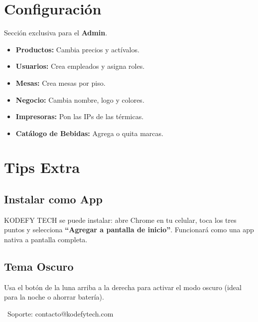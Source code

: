\documentclass[10pt,a4paper,twoside]{article}
\begin{document}
\section{Configuración}

Sección exclusiva para el \textbf{Admin}.

\begin{itemize}[itemsep=1pt, leftmargin=15pt]
    \item \textbf{Productos:} Cambia precios y actívalos.
    \item \textbf{Usuarios:} Crea empleados y asigna roles.
    \item \textbf{Mesas:} Crea mesas por piso.
    \item \textbf{Negocio:} Cambia nombre, logo y colores.
    \item \textbf{Impresoras:} Pon las IPs de las térmicas.
    \item \textbf{Catálogo de Bebidas:} Agrega o quita marcas.
\end{itemize}

\section{Tips Extra}

\subsection{Instalar como App}
KODEFY TECH se puede instalar: abre Chrome en tu celular, toca los tres puntos y selecciona \textbf{``Agregar a pantalla de inicio''}. Funcionará como una app nativa a pantalla completa.

\subsection{Tema Oscuro}
Usa el botón de la luna arriba a la derecha para activar el modo oscuro (ideal para la noche o ahorrar batería).

\vspace{1cm}

\begin{center}
    {\large \faWhatsapp\ Soporte: contacto@kodefytech.com}
\end{center}
\end{document}
